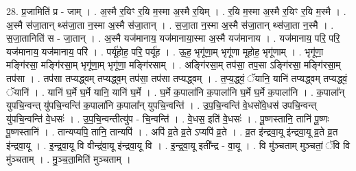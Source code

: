 \documentclass[17pt]{extarticle}
\begin{document}
28. प्र॒जामिति॑ प्र - जाम् । . अ॒स्मै र॒यिꣳ र॒यि म॒स्मा अ॒स्मै र॒यिम् । . र॒यि म॒स्मा अ॒स्मै र॒यिꣳ र॒यि म॒स्मै । . अ॒स्मै स॑जा॒तान् थ्स॑जा॒ता न॒स्मा अ॒स्मै स॑जा॒तान् । . स॒जा॒ता न॒स्मा अ॒स्मै स॑जा॒तान् थ्स॑जा॒ता न॒स्मै । . स॒जा॒तानिति॑ स - जा॒तान् । . अ॒स्मै यज॑मानाय॒ यज॑मानाया॒स्मा अ॒स्मै यज॑मानाय । . यज॑मानाय॒ परि॒ परि॒ यज॑मानाय॒ यज॑मानाय॒ परि॑ । . पर्यू॑होह॒ परि॒ पर्यू॑ह । . ऊ॒ह॒ भृगू॑णा॒म् भृगू॑णा मूहोह॒ भृगू॑णाम् । . भृगू॑णा॒ मङ्गि॑रसा॒ मङ्गि॑रसा॒म् भृगू॑णा॒म् भृगू॑णा॒ मङ्गि॑रसाम् । . अङ्गि॑रसा॒म् तप॑सा॒ तप॒सा ऽङ्गि॑रसा॒ मङ्गि॑रसा॒म् तप॑सा । . तप॑सा तप्यद्ध्वम् तप्यद्ध्व॒म् तप॑सा॒ तप॑सा तप्यद्ध्वम् । . त॒प्य॒द्ध्वं॒ ॅयानि॒ यानि॑ तप्यद्ध्वम् तप्यद्ध्वं॒ ॅयानि॑ । . यानि॑ घ॒र्मे घ॒र्मे यानि॒ यानि॑ घ॒र्मे । . घ॒र्मे क॒पाला॑नि क॒पाला॑नि घ॒र्मे घ॒र्मे क॒पाला॑नि । . क॒पाला᳚न् युपचि॒न्वन्त् यु॑पचि॒न्वन्ति॑ क॒पाला॑नि क॒पाला᳚न् युपचि॒न्वन्ति॑ । . उ॒प॒चि॒न्वन्ति॑ वे॒धसो॑वे॒धस॑ उपचि॒न्वन्त् यु॑पचि॒न्वन्ति॑ वे॒धसः॑ । . उ॒प॒चि॒न्वन्तीत्यु॑प - चि॒न्वन्ति॑ । . वे॒धस॒ इति॑ वे॒धसः॑ । . पू॒ष्णस्तानि॒ तानि॑ पू॒ष्णः पू॒ष्णस्तानि॑ । . तान्यप्यपि॒ तानि॒ तान्यपि॑ । . अपि॑ व्र॒ते व्र॒ते ऽप्यपि॑ व्र॒ते । . व्र॒त इ॑न्द्रवा॒यू इ॑न्द्रवा॒यू व्र॒ते व्र॒त इ॑न्द्रवा॒यू । . इ॒न्द्र॒वा॒यू वि वीन्द्र॑वा॒यू इ॑न्द्रवा॒यू वि । . इ॒न्द्र॒वा॒यू इती᳚न्द्र - वा॒यू । . वि मु॑ञ्चताम् मुञ्चतां॒ ॅवि वि मु॑ञ्चताम् । . मु॒ञ्च॒ता॒मिति॑ मुञ्चताम् । \newline
\end{document}
